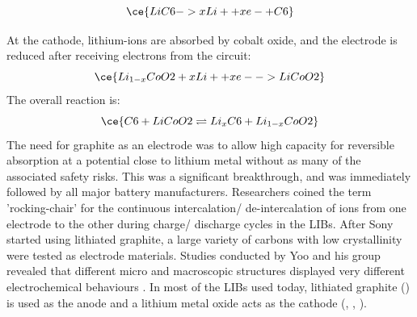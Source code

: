 \begin{equation}
\ce{LiC6 -> xLi+ +  xe- + C6}
\end{equation}

At the cathode, lithium-ions are absorbed by cobalt oxide, and the electrode is reduced after receiving electrons from the circuit:
\begin{equation}
\ce{Li_{1-x}CoO2 + xLi+ + xe- -> LiCoO2}
\end{equation}
The overall reaction is:
\begin{equation}
\ce{C6 + LiCoO2 \rightleftharpoons Li_{x}C6 + Li_{1-x}CoO2}
\end{equation}
The need for graphite as an electrode was to allow high capacity for reversible  absorption at a potential close to lithium metal without as many of the associated safety risks. This was a significant breakthrough, and was immediately followed by all major battery manufacturers. Researchers coined the term 'rocking-chair' for the  continuous intercalation/ de-intercalation of ions from one electrode to the other during charge/ discharge cycles in the LIBs. After Sony started using lithiated graphite, a large variety of carbons with low crystallinity were tested as electrode materials. Studies conducted by Yoo and his group revealed that different micro and macroscopic structures displayed very different electrochemical behaviours \cite{yoo_large_2008}. In most of the LIBs used today, lithiated graphite () is used as the anode and a lithium metal oxide acts as the cathode (, , ).  

